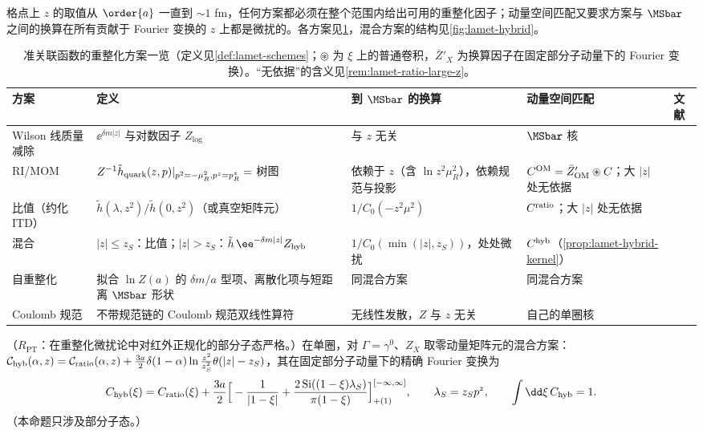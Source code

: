 格点上 $z$ 的取值从 $\order{a}$ 一直到 $\sim1$ fm，任何方案都必须在整个范围内给出可用的重整化因子；动量空间匹配又要求方案与 $\MSbar$ 之间的换算在所有贡献于 Fourier 变换的 $z$ 上都是微扰的。各方案见\cref{tab:lamet-schemes}，混合方案的结构见\cref{fig:lamet-hybrid}。

\begin{table}[htbp]
\centering
\footnotesize
\renewcommand{\arraystretch}{1.12}
\begin{tabularx}{\textwidth}{@{}p{1.8cm}Xp{2.75cm}p{2.6cm}p{2.1cm}@{}}
\toprule
方案 & 定义 & 到 $\MSbar$ 的换算 & 动量空间匹配 & 文献 \\
\midrule
Wilson 线质量减除 & $\ee^{\delta m|z|}$ 与对数因子 $Z_{\log}$ & 与 $z$ 无关 & $\MSbar$ 核 & \cite{Chen:2016fxx,Ishikawa:2016znu,Green:2017xeu} \\
RI/MOM & $Z^{-1}\tilde h_{\rm quark}(z,p)|_{p^2=-\mu_R^2,p^z=p^z_R}=$ 树图 & 依赖于 $z$（含 $\ln z^2\mu_R^2$），依赖规范与投影 & $C^{\rm OM}=\bar Z'_{\rm OM}\circledast C$；大 $|z|$ 处无依据 & \cite{Constantinou:2017sej,Stewart:2017tvs,Alexandrou:2017huk,Chen:2017mzz,LatticeParton:2018gjr} \\
比值（约化 ITD） & $\tilde h(\lambda,z^2)/\tilde h(0,z^2)$（或真空矩阵元） & $1/C_0(-z^2\mu^2)$ & $C^{\rm ratio}$；大 $|z|$ 处无依据 & \cite{Radyushkin2017,Orginos:2017kos,Braun:2018brg} \\
混合 & $|z|\le z_S$：比值；$|z|>z_S$：$\tilde h\,\ee^{-\delta m|z|}Z_{\rm hyb}$ & $1/C_0(\min(|z|,z_S))$，处处微扰 & $C^{\rm hyb}$（\cref{prop:lamet-hybrid-kernel}） & \cite{Ji:2020brr} \\
自重整化 & 拟合 $\ln Z(a)$ 的 $\delta m/a$ 型项、离散化项与短距离 $\MSbar$ 形状 & 同混合方案 & 同混合方案 & \cite{LatticePartonLPC:2021gpi} \\
Coulomb 规范 & 不带规范链的 Coulomb 规范双线性算符 & 无线性发散，$Z$ 与 $z$ 无关 & 自己的单圈核 & \cite{Gao:2023lny,Zhao:2023ptv} \\
\bottomrule
\end{tabularx}
\caption{准关联函数的重整化方案一览（定义见\cref{def:lamet-schemes}；$\circledast$ 为 $\xi$ 上的普通卷积，$\bar Z'_X$ 为换算因子在固定部分子动量下的 Fourier 变换）。“无依据”的含义见\cref{rem:lamet-ratio-large-z}。}
\label{tab:lamet-schemes}
\end{table}

\begin{proposition}\label{prop:lamet-hybrid-kernel}
（$R_{\mathrm{PT}}$：在重整化微扰论中对红外正规化的部分子态严格。）在单圈，对 $\Gamma=\gamma^0$、$Z_X$ 取零动量矩阵元的混合方案：$\mathcal C_{\rm hyb}(\alpha,z)=\mathcal C_{\rm ratio}(\alpha,z)+\frac{3a}2\delta(1-\alpha)\ln\frac{z^2}{z_S^2}\theta(|z|-z_S)$，其在固定部分子动量下的精确 Fourier 变换为
\begin{equation}\label{eq:lamet-hybrid-kernel}
C_{\rm hyb}(\xi)=C_{\rm ratio}(\xi)+\frac{3a}2\Big[-\frac1{|1-\xi|}+\frac{2\,{\rm Si}((1-\xi)\lambda_S)}{\pi(1-\xi)}\Big]^{[-\infty,\infty]}_{+(1)},\qquad\lambda_S=z_Sp^z,\qquad\int\dd\xi\,C_{\rm hyb}=1 .
\end{equation}%
（本命题只涉及部分子态。）
\end{proposition}

